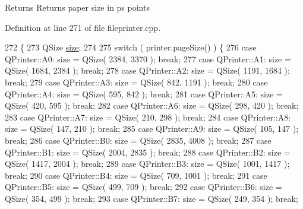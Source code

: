 \begin{DoxyReturn}{Returns}
Returns paper size in ps points 
\end{DoxyReturn}


Definition at line 271 of file fileprinter.\+cpp.


\begin{DoxyCode}
272 \{
273     QSize \hyperlink{synctex__parser_8c_aa23c661441688350614bd6a350d2b6ff}{size};
274 
275     \textcolor{keywordflow}{switch} ( printer.pageSize() ) \{
276     \textcolor{keywordflow}{case} QPrinter::A0:        size = QSize( 2384, 3370 ); \textcolor{keywordflow}{break};
277     \textcolor{keywordflow}{case} QPrinter::A1:        size = QSize( 1684, 2384 ); \textcolor{keywordflow}{break};
278     \textcolor{keywordflow}{case} QPrinter::A2:        size = QSize( 1191, 1684 ); \textcolor{keywordflow}{break};
279     \textcolor{keywordflow}{case} QPrinter::A3:        size = QSize(  842, 1191 ); \textcolor{keywordflow}{break};
280     \textcolor{keywordflow}{case} QPrinter::A4:        size = QSize(  595,  842 ); \textcolor{keywordflow}{break};
281     \textcolor{keywordflow}{case} QPrinter::A5:        size = QSize(  420,  595 ); \textcolor{keywordflow}{break};
282     \textcolor{keywordflow}{case} QPrinter::A6:        size = QSize(  298,  420 ); \textcolor{keywordflow}{break};
283     \textcolor{keywordflow}{case} QPrinter::A7:        size = QSize(  210,  298 ); \textcolor{keywordflow}{break};
284     \textcolor{keywordflow}{case} QPrinter::A8:        size = QSize(  147,  210 ); \textcolor{keywordflow}{break};
285     \textcolor{keywordflow}{case} QPrinter::A9:        size = QSize(  105,  147 ); \textcolor{keywordflow}{break};
286     \textcolor{keywordflow}{case} QPrinter::B0:        size = QSize( 2835, 4008 ); \textcolor{keywordflow}{break};
287     \textcolor{keywordflow}{case} QPrinter::B1:        size = QSize( 2004, 2835 ); \textcolor{keywordflow}{break};
288     \textcolor{keywordflow}{case} QPrinter::B2:        size = QSize( 1417, 2004 ); \textcolor{keywordflow}{break};
289     \textcolor{keywordflow}{case} QPrinter::B3:        size = QSize( 1001, 1417 ); \textcolor{keywordflow}{break};
290     \textcolor{keywordflow}{case} QPrinter::B4:        size = QSize(  709, 1001 ); \textcolor{keywordflow}{break};
291     \textcolor{keywordflow}{case} QPrinter::B5:        size = QSize(  499,  709 ); \textcolor{keywordflow}{break};
292     \textcolor{keywordflow}{case} QPrinter::B6:        size = QSize(  354,  499 ); \textcolor{keywordflow}{break};
293     \textcolor{keywordflow}{case} QPrinter::B7:        size = QSize(  249,  354 ); \textcolor{keywordflow}{break};

\end{DoxyCode}
